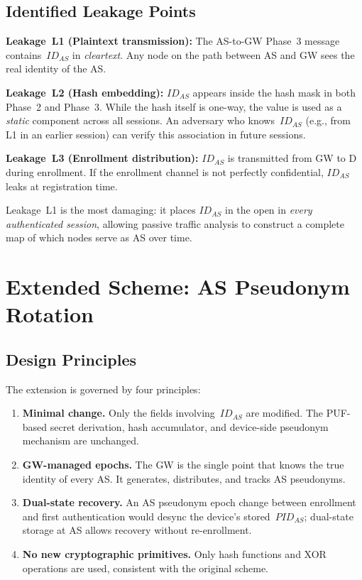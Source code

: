 \documentclass[12pt,a4paper]{article}
\newcommand{\IDas}{\mathit{ID}_{AS}}
\newcommand{\PIDas}{\mathit{PID}_{AS}}
\begin{document}
\subsection{Identified Leakage Points}

\begin{mdframed}[backgroundcolor=yellow!10,linecolor=red!60!black,linewidth=1.2pt]
\textbf{Leakage~L1 (Plaintext transmission):}
The AS-to-GW Phase~3 message contains~$\IDas$ in \emph{cleartext}.
Any node on the path between AS and GW sees the real identity of the AS.

\textbf{Leakage~L2 (Hash embedding):}
$\IDas$ appears inside the hash mask in both Phase~2 and Phase~3.
While the hash itself is one-way, the value is used as a \emph{static}
component across all sessions.
An adversary who knows~$\IDas$ (e.g., from L1 in an earlier session)
can verify this association in future sessions.

\textbf{Leakage~L3 (Enrollment distribution):}
$\IDas$ is transmitted from GW to D during enrollment.
If the enrollment channel is not perfectly confidential, $\IDas$ leaks
at registration time.
\end{mdframed}

Leakage~L1 is the most damaging: it places $\IDas$ in the open in
\emph{every authenticated session}, allowing passive traffic analysis
to construct a complete map of which nodes serve as AS over time.

\section{Extended Scheme: AS Pseudonym Rotation}

\subsection{Design Principles}

The extension is governed by four principles:
\begin{enumerate}
  \item \textbf{Minimal change.} Only the fields involving~$\IDas$
        are modified.  The PUF-based secret derivation, hash accumulator,
        and device-side pseudonym mechanism are unchanged.
  \item \textbf{GW-managed epochs.}  The GW is the single point that
        knows the true identity of every AS.  It generates, distributes,
        and tracks AS pseudonyms.
  \item \textbf{Dual-state recovery.}  An AS pseudonym epoch change
        between enrollment and first authentication would desync the
        device's stored~$\PIDas$; dual-state storage at AS allows
        recovery without re-enrollment.
  \item \textbf{No new cryptographic primitives.}  Only hash functions
        and XOR operations are used, consistent with the original scheme.
\end{enumerate}
\end{document}
